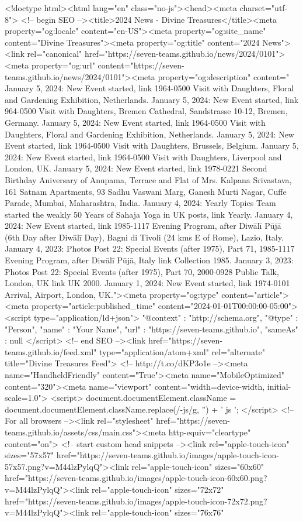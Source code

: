 <!doctype html><html lang="en" class="no-js"><head><meta charset="utf-8"> <!-- begin SEO --><title>2024 News - Divine Treasures</title><meta property="og:locale" content="en-US"><meta property="og:site_name" content="Divine Treasures"><meta property="og:title" content="2024 News"><link rel="canonical" href="https://seven-teams.github.io/news/2024/0101"><meta property="og:url" content="https://seven-teams.github.io/news/2024/0101"><meta property="og:description" content=" January 5, 2024: New Event started, link 1964-0500 Visit with Daughters, Floral and Gardening Exhibition, Netherlands. January 5, 2024: New Event started, link 964-0500 Visit with Daughters, Bremen Cathedral, Sandstrasse 10-12, Bremen, Germany. January 5, 2024: New Event started, link 1964-0500 Visit with Daughters, Floral and Gardening Exhibition, Netherlands. January 5, 2024: New Event started, link 1964-0500 Visit with Daughters, Brussels, Belgium. January 5, 2024: New Event started, link 1964-0500 Visit with Daughters, Liverpool and London, UK. January 5, 2024: New Event started, link 1978-0221 Second Birthday Aniversary of Anupama, Terrace and Flat of Mrs. Kalpana Srivastava, 161 Satnam Apartments, 93 Sadhu Vaswani Marg, Ganesh Murti Nagar, Cuffe Parade, Mumbai, Maharashtra, India. January 4, 2024: Yearly Topics Team started the weakly 50 Years of Sahaja Yoga in UK posts, link Yearly. January 4, 2024: New Event started, link 1985-1117 Evening Program, after Diwālī Pūjā (6th Day after Diwālī Day), Bagni di Tivoli (24 kms E of Rome), Lazio, Italy. January 4, 2023: Photos Post 22: Special Events (after 1975), Part 71, 1985-1117 Evening Program, after Diwālī Pūjā, Italy link Collection 1985. January 3, 2023: Photos Post 22: Special Events (after 1975), Part 70, 2000-0928 Public Talk, London, UK link UK 2000. January 1, 2024: New Event started, link 1974-0101 Arrival, Airport, London, UK."><meta property="og:type" content="article"><meta property="article:published_time" content="2024-01-01T00:00:00-05:00"> <script type="application/ld+json"> { "@context" : "http://schema.org", "@type" : "Person", "name" : "Your Name", "url" : "https://seven-teams.github.io", "sameAs" : null } </script> <!-- end SEO --><link href="https://seven-teams.github.io/feed.xml" type="application/atom+xml" rel="alternate" title="Divine Treasures Feed"> <!-- http://t.co/dKP3o1e --><meta name="HandheldFriendly" content="True"><meta name="MobileOptimized" content="320"><meta name="viewport" content="width=device-width, initial-scale=1.0"> <script> document.documentElement.className = document.documentElement.className.replace(/\bno-js\b/g, '') + ' js '; </script> <!-- For all browsers --><link rel="stylesheet" href="https://seven-teams.github.io/assets/css/main.css"><meta http-equiv="cleartype" content="on"> <!-- start custom head snippets --><link rel="apple-touch-icon" sizes="57x57" href="https://seven-teams.github.io/images/apple-touch-icon-57x57.png?v=M44lzPylqQ"><link rel="apple-touch-icon" sizes="60x60" href="https://seven-teams.github.io/images/apple-touch-icon-60x60.png?v=M44lzPylqQ"><link rel="apple-touch-icon" sizes="72x72" href="https://seven-teams.github.io/images/apple-touch-icon-72x72.png?v=M44lzPylqQ"><link rel="apple-touch-icon" sizes="76x76" 